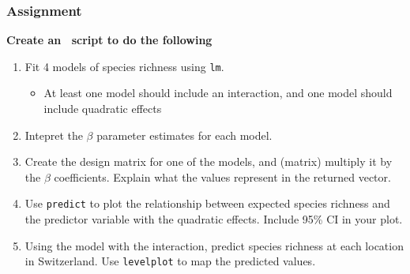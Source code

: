 \documentclass[color=usenames,dvipsnames]{beamer}\usepackage[]{graphicx}\usepackage[]{color}
\begin{document}
\begin{frame}
  \frametitle{Assignment}
  \large
  {\bf Create an \R~script to do the following}
  \begin{enumerate}
    \item Fit 4 models of species richness using {\tt lm}.
      \begin{itemize} \large
        \item At least one model should include an interaction, and
          one model should include quadratic effects
      \end{itemize}
    \item Intepret the $\beta$ parameter estimates for each model.
    \item Create the design matrix for one of the models, and (matrix)
      multiply it by the $\beta$ coefficients. Explain what the values
      represent in the returned vector.
    \item Use {\tt predict} to plot the relationship between expected
      species richness and the predictor variable with the quadratic
      effects. Include 95\% CI in your plot.
    \item Using the model with the interaction, predict species
      richness at each location in Switzerland. Use {\tt levelplot} to
      map the predicted values.
  \end{enumerate}
\end{frame}
\end{document}
